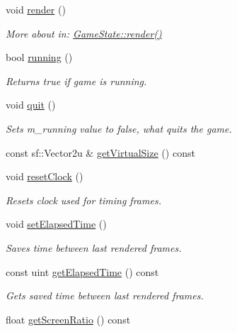 \begin{DoxyCompactItemize}
void \mbox{\hyperlink{class_game_engine_a267bf9164ba09e32b7a24ba4afb527d4}{render}} ()
\begin{DoxyCompactList}\small\item\em More about in\+: \mbox{\hyperlink{class_game_state_a0d56cd5355f59a87cf95e1c6d719f329}{Game\+State\+::render()}} \end{DoxyCompactList}\item 
bool \mbox{\hyperlink{class_game_engine_ab3f9945e3cb77c3ae0a7e0c91c22c19a}{running}} ()
\begin{DoxyCompactList}\small\item\em Returns true if game is running. \end{DoxyCompactList}\item 
void \mbox{\hyperlink{class_game_engine_ad82b626def2e52b28f0d6c2d167589f6}{quit}} ()
\begin{DoxyCompactList}\small\item\em Sets m\+\_\+running value to false, what quits the game. \end{DoxyCompactList}\item 
const sf\+::\+Vector2u \& \mbox{\hyperlink{class_game_engine_a77d8443f4919f8eca96acfb40e6b64bd}{get\+Virtual\+Size}} () const
\item 
void \mbox{\hyperlink{class_game_engine_a0f906c0e3c093e66abf1d387767d2a24}{reset\+Clock}} ()
\begin{DoxyCompactList}\small\item\em Resets clock used for timing frames. \end{DoxyCompactList}\item 
void \mbox{\hyperlink{class_game_engine_a579b1c7d9ca8d4cb9f788824f969ae68}{set\+Elapsed\+Time}} ()
\begin{DoxyCompactList}\small\item\em Saves time between last rendered frames. \end{DoxyCompactList}\item 
const uint \mbox{\hyperlink{class_game_engine_a83d4cc180c4ad2c7db5224ce840140e1}{get\+Elapsed\+Time}} () const
\begin{DoxyCompactList}\small\item\em Gets saved time between last rendered frames. \end{DoxyCompactList}\item 
float \mbox{\hyperlink{class_game_engine_a6328d97829e7f0a79a5672c5dd040592}{get\+Screen\+Ratio}} () const
\end{DoxyCompactItemize}
